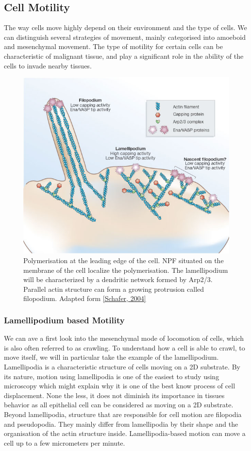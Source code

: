 \documentclass[A4paperpaper,11pt,english]{sphinxmanual}
\begin{document}
\subsection{Cell Motility}
\label{parts/part1:cell-motility}
The way cells move highly depend on their environment and the type of cells.
We can distinguish several strategies of movement, mainly categorised into
amoeboid and mesenchymal movement. The type of motility for certain
cells can be characteristic of malignant tissue, and play a significant role in
the ability of the cells to invade nearby tissues.
\begin{figure}[htbp]
\centering
\capstart

\includegraphics[width=0.600\linewidth]{Schafer2004.jpg}
\caption{Polymerisation at the leading edge of the cell. NPF situated on the
membrane of the cell localize the polymerisation. The lamellipodium will be
characterized by a dendritic network formed by Arp2/3. Parallel actin
structure can form a growing protrusion called filopodium.  Adapted form
{\hyperref[parts/part1:schafer2004]{{[}Schafer,  2004{]}}}}\end{figure}


\subsubsection{Lamellipodium based Motility}
\label{parts/part1:lamellipodium-based-motility}
We can ave a first look into the mesenchymal mode of locomotion of cells, which is
also often referred to as crawling. To understand how a cell is able to crawl,
to move itself, we will in particular take the example of the lamellipodium.
Lamellipodia is a characteristic structure of cells moving on a 2D substrate. By
its nature, motion using lamellipodia is  one of the easiest to study using
microscopy which might explain why it is one of the best know process of cell
displacement. None the less, it does not diminish its importance in tissues
behavior as all epithelial cell can be considered as moving on a 2D substrate.
Beyond lamellipodia, structure that are responsible for cell motion are
filopodia and pseudopodia. They mainly differ from lamellipodia by their shape
and the organisation of the actin structure inside. Lamellipodia-based motion
can move a cell up to a few micrometers per minute.
\end{document}
